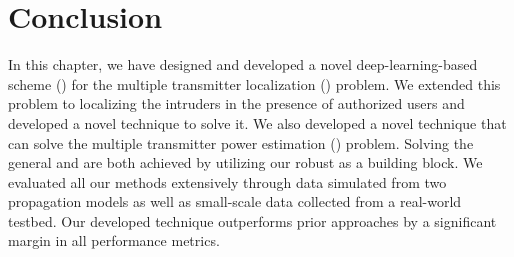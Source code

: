 \section{Conclusion}

In this chapter, we have designed and developed a novel deep-learning-based scheme (\our) for
the multiple transmitter localization (\mtl) problem.
We extended this problem to localizing the intruders in the presence of authorized users and developed a novel technique to solve it. 
We also developed a novel technique that can solve the multiple transmitter power estimation (\mtpe) problem.
Solving the general \mtl and \mtpe are both achieved by utilizing our robust \our as a building block. 
We evaluated all our methods extensively through data simulated from two propagation models as well as small-scale data collected from a real-world testbed. 
Our developed technique outperforms prior approaches by a significant margin in all performance metrics.


